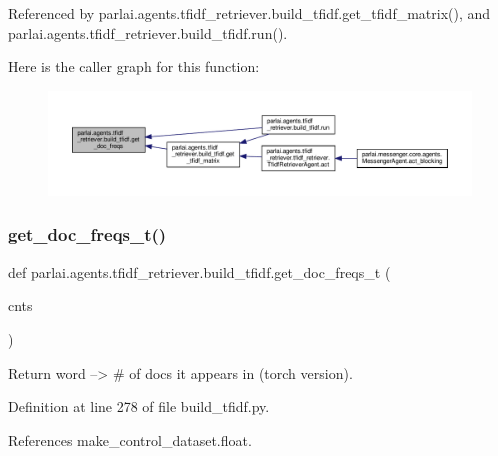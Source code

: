 Referenced by parlai.\+agents.\+tfidf\+\_\+retriever.\+build\+\_\+tfidf.\+get\+\_\+tfidf\+\_\+matrix(), and parlai.\+agents.\+tfidf\+\_\+retriever.\+build\+\_\+tfidf.\+run().

Here is the caller graph for this function\+:
\nopagebreak
\begin{figure}[H]
\begin{center}
\leavevmode
\includegraphics[width=350pt]{namespaceparlai_1_1agents_1_1tfidf__retriever_1_1build__tfidf_ac6883ed21006848661f6c748f91aff56_icgraph}
\end{center}
\end{figure}
\mbox{\label{namespaceparlai_1_1agents_1_1tfidf__retriever_1_1build__tfidf_a284d006ecb031c337c64d7debe1407d3}} 
\subsubsection{\texorpdfstring{get\+\_\+doc\+\_\+freqs\+\_\+t()}{get\_doc\_freqs\_t()}}
{\footnotesize\ttfamily def parlai.\+agents.\+tfidf\+\_\+retriever.\+build\+\_\+tfidf.\+get\+\_\+doc\+\_\+freqs\+\_\+t (\begin{DoxyParamCaption}\item[{}]{cnts }\end{DoxyParamCaption})}

\begin{DoxyVerb}Return word --> # of docs it appears in (torch version).\end{DoxyVerb}
 

Definition at line 278 of file build\+\_\+tfidf.\+py.



References make\+\_\+control\+\_\+dataset.\+float.



